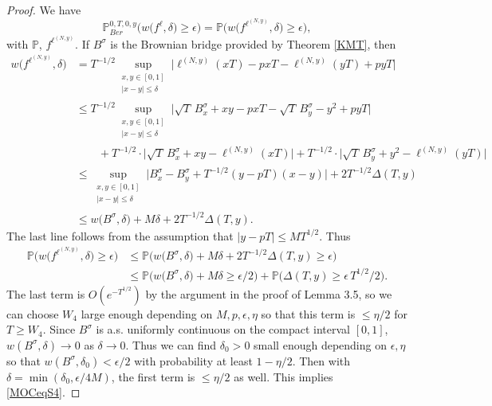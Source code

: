 \begin{proof}
	We have
	\[
	\mathbb{P}^{0,T,0,y}_{Ber}\Big( w\big({f^\ell},\delta\big) \geq \epsilon \Big) = \mathbb{P}\Big( w\big(f^{\ell^{(N,y)}},\delta\big) \geq \epsilon \Big),
	\]
	with $\mathbb{P}$, $f^{\ell^{(N,y)}}$. If $B^\sigma$ is the Brownian bridge provided by Theorem \ref{KMT}, then
	\begin{align*}
	w\big(f^{\ell^{(N,y)}},\delta\big) &= T^{-1/2} \sup_{\substack{x,y \in [0,1]\\ |x-y| \leq \delta}} \Big| \ell^{(N,y)}(xT) - pxT - \ell^{(N,y)}(yT) + pyT \Big|\\
	&\leq T^{-1/2} \sup_{\substack{x,y \in [0,1]\\ |x-y| \leq \delta}} \Big| \sqrt{T}\,B^\sigma_x + xy - pxT - \sqrt{T}\,B^\sigma_y - y^2 + pyT \Big|\\
	&\qquad + T^{-1/2}\cdot\Big|\sqrt{T}\,B^\sigma_x + xy - \ell^{(N,y)}(xT)\Big| + T^{-1/2}\cdot\Big|\sqrt{T}\,B^\sigma_y + y^2 - \ell^{(N,y)}(yT)\Big|\\
	&\leq \sup_{\substack{x,y \in [0,1]\\ |x-y| \leq \delta}} \Big| B^\sigma_x - B^\sigma_y + T^{-1/2} (y-pT)(x-y)\Big| + 2T^{-1/2}\Delta(T,y)\\
	&\leq w\big(B^\sigma,\delta\big) + M\delta + 2T^{-1/2}\Delta(T,y).
	\end{align*}
	The last line follows from the assumption that $|y-pT|\leq MT^{1/2}$. Thus
	\begin{align*}
	\mathbb{P}\Big( w\big(f^{\ell^{(N,y)}},\delta\big) \geq \epsilon \Big) &\leq \mathbb{P}\Big( w\big(B^\sigma,\delta\big) + M\delta + 2T^{-1/2}\Delta(T,y) \geq \epsilon \Big)\\
	&\leq \mathbb{P}\Big( w\big(B^\sigma,\delta\big) + M\delta \geq \epsilon/2 \Big) + \mathbb{P}\Big( \Delta(T,y) \geq \epsilon\, T^{1/2}/2 \Big).
	\end{align*}
	The last term is $O(e^{-T^{1/2}})$ by the argument in the proof of Lemma 3.5, so we can choose $W_4$ large enough depending on $M,p,\epsilon,\eta$ so that this term is $\leq\eta/2$ for $T\geq W_4$. Since $B^\sigma$ is a.s. uniformly continuous on the compact interval $[0,1]$, $w(B^\sigma,\delta) \to 0$ as $\delta\to 0$. Thus we can find $\delta_0>0$ small enough depending on $\epsilon,\eta$ so that $w(B^\sigma,\delta_0) < \epsilon/2$ with probability at least $1-\eta/2$. Then with $\delta = \min(\delta_0, \epsilon/4M)$, the first term is $\leq\eta/2$ as well. This implies \eqref{MOCeqS4}.
\end{proof}


